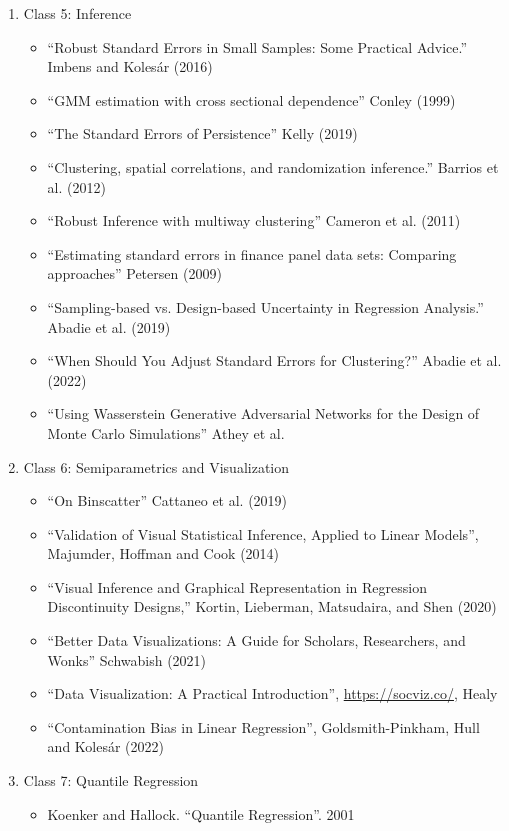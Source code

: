 \documentclass[11pt, a4paper]{article}
\begin{document}
\begin{enumerate}
\begin{enumerate}
  \item Class 5: Inference
    \begin{itemize}
    \item ``Robust Standard Errors in Small Samples: Some Practical Advice.'' Imbens and Koles\'ar  (2016)
    \item ``GMM estimation with cross sectional dependence'' Conley (1999)
    \item ``The Standard Errors of Persistence'' Kelly (2019)
    \item ``Clustering, spatial correlations, and randomization inference.'' Barrios et al. (2012)
    \item ``Robust Inference with multiway clustering'' Cameron et al. (2011)
    \item ``Estimating standard errors in finance panel data sets: Comparing approaches'' Petersen (2009)
    \item  ``Sampling-based vs. Design-based Uncertainty in Regression Analysis.'' Abadie et al. (2019)
    \item  ``When Should You Adjust Standard Errors for Clustering?'' Abadie et al. (2022)
    \item  ``Using Wasserstein Generative Adversarial Networks for the Design of Monte Carlo Simulations'' Athey et al.
    \end{itemize}
  \item Class 6: Semiparametrics and Visualization
    \begin{itemize}
    \item ``On Binscatter'' Cattaneo et al. (2019)
    \item ``Validation of Visual Statistical Inference, Applied to Linear Models'', Majumder, Hoffman and Cook (2014)
    \item ``Visual Inference and Graphical Representation in Regression Discontinuity Designs,'' Kortin, Lieberman, Matsudaira, and Shen (2020)
    \item ``Better Data Visualizations: A Guide for Scholars, Researchers, and Wonks'' Schwabish (2021)
    \item ``Data Visualization: A Practical Introduction'', \url{https://socviz.co/}, Healy
    \item ``Contamination Bias in Linear Regression'', Goldsmith-Pinkham, Hull and Koles\'ar (2022)
    \end{itemize}
  \item Class 7: Quantile Regression
    \begin{itemize}
    \item Koenker and Hallock. ``Quantile Regression''. 2001

\end{itemize}
\end{enumerate}
\end{enumerate}
\end{document}
